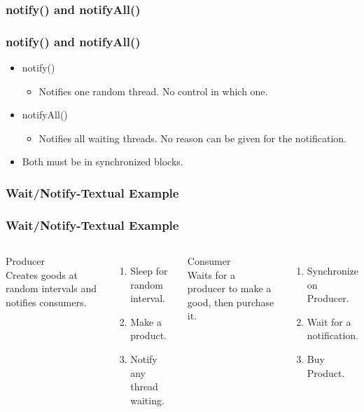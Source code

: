 \documentclass{beamer}
\begin{document}
\subsubsection{notify() and notifyAll()}
\begin{frame}
\frametitle{notify() and notifyAll()}
\begin{itemize}
\item notify()
\begin{itemize}
\item Notifies one random thread. No control in which one.
\end{itemize}
\item notifyAll()
\begin{itemize}
\item Notifies all waiting threads. No reason can be given for the notification.
\end{itemize}
\item Both must be in synchronized blocks.
\end{itemize}

\end{frame}

\subsubsection{Wait/Notify-Textual Example}
\begin{frame}
\frametitle{Wait/Notify-Textual Example}
\begin{columns}[t]
{\LARGE Producer \\}
Creates goods at random intervals and {\color{red} notifies} consumers.
\begin{enumerate}
\item Sleep for random interval.
\item Make a product.
\item {\color{red} Notify} any thread waiting. 
\end{enumerate}
{\LARGE Consumer \\}
Waits for a producer to make a good, then purchase it.
\begin{enumerate}
\item {\color{blue}Synchronize} on Producer.
\item {\color{green}Wait} for a notification.
\item Buy Product.
\end{enumerate}
\end{columns}
\end{frame}
\end{document}
